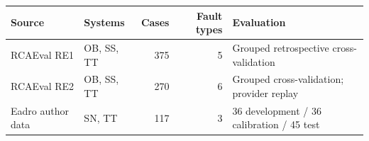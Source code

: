 \begin{tabular*}{\linewidth}{@{\extracolsep{\fill}}llrrl@{}}
\toprule
Source & Systems & Cases & Fault types & Evaluation \\
\midrule
RCAEval RE1 & OB, SS, TT & 375 & 5 & Grouped retrospective cross-validation \\
RCAEval RE2 & OB, SS, TT & 270 & 6 & Grouped cross-validation; provider replay \\
Eadro author data & SN, TT & 117 & 3 & 36 development / 36 calibration / 45 test \\
\bottomrule
\end{tabular*}
